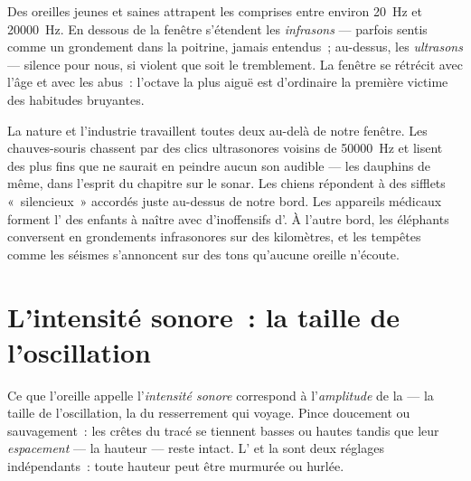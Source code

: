 \begin{proposition}\label{prop:g8:sound-pitch-loudness:range}
Des oreilles jeunes et saines attrapent les  comprises entre
environ \qty{20}{Hz} et \qty{20000}{Hz}. En dessous de la fenêtre
s'étendent les \emph{infrasons} --- parfois sentis
comme un grondement dans la poitrine, jamais entendus~; au-dessus, les
\emph{ultrasons} --- silence pour nous, si violent que
soit le tremblement. La fenêtre se rétrécit avec l'âge et avec les
abus~: l'octave la plus aiguë est d'ordinaire la première victime des
habitudes bruyantes.
\end{proposition}

\begin{example}\label{ex:g8:sound-pitch-loudness:beyond}
La nature et l'industrie travaillent toutes deux au-delà de notre
fenêtre. Les chauves-souris chassent par des clics ultrasonores voisins
de \qty{50000}{Hz} et lisent des  plus fins que ne saurait en
peindre aucun son audible --- les dauphins de même, dans l'esprit du
chapitre sur le sonar. Les chiens répondent à des sifflets
«~silencieux~» accordés juste au-dessus de notre bord. Les appareils
médicaux forment l' des enfants à naître avec d'inoffensifs 
d'. À l'autre bord, les éléphants conversent en grondements
infrasonores sur des kilomètres, et les tempêtes comme les séismes
s'annoncent sur des tons qu'aucune oreille n'écoute.
\end{example}

\section{L'intensité sonore~: la taille de l'oscillation}

\begin{proposition}\label{prop:g8:sound-pitch-loudness:loudness}
Ce que l'oreille appelle l'\emph{intensité sonore} correspond à
l'\emph{amplitude} de la  --- la taille de
l'oscillation, la  du resserrement qui voyage. Pince doucement ou
sauvagement~: les crêtes du tracé se tiennent basses ou hautes tandis
que leur \emph{espacement} --- la hauteur --- reste intact.
L' et la  sont deux réglages indépendants~: toute
hauteur peut être murmurée ou hurlée.
\end{proposition}

